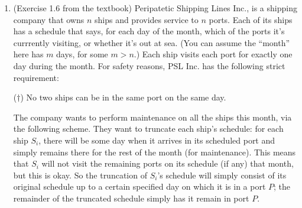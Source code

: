 \documentclass[12pt]{article}
\begin{document}
\begin{enumerate}[leftmargin=*]
\begin{proof}[Solution to (b)]
    There does not always exist a perfect matching with no weak instability.
    Suppose we have a set of two student, $\{s, s'\}$, and a set of two hospital, $\{h, h'\}$. The preference lists are as follows:
    \begin{center}
        $s$ is indifferent between $h$ and $h'$;\\
        $s'$ is indifferent between $h$ and $h'$;\\
        $h$ prefers $s$ to $s'$;\\
        $h'$ prefers $s$ to $s'$.
    \end{center}

    In this case, there are two perfect matchings: $M_1 = \{(s, h), (s', h')\}$ and $M_2 = \{(s, h'), (s', h)\}$. 
    Both of these matchings have a weak instability. 
    In $M_1$, the pair $(s, h')$ is a weak instability because $h'$ prefers $s$ to $s'$ and $s$ is indifferent between the two hospitals.
    In $M_2$, the pair $(s, h)$ is a weak instability because $h$ prefers $s$ to $s'$ and $s$ is indifferent between the two hospitals. 
    Therefore, in this example, every perfect matching has a weak instability.
\end{proof}




\item (Exercise 1.6 from the textbook) Peripatetic Shipping Lines Inc., is a shipping company that owns $n$ ships and provides service to $n$ ports. Each of its ships has a schedule that says, for each day of the month, which of the ports it's currrently visiting, or whether it's out at sea. (You can assume the ``month'' here has $m$ days, for some $m > n$.) Each ship visits each port for exactly one day during the month. For safety reasons, PSL Inc. has the following strict requirement:

\begin{center}
($\dagger$) No two ships can be in the same port on the same day.
\end{center}

The company wants to perform maintenance on all the ships this month, via the following scheme. They want to truncate each ship's schedule: for each ship $S_i$, there will be some day when it arrives in its scheduled port and simply remains there for the rest of the month (for maintenance). This means that $S_i$ will not visit the remaining ports on its schedule (if any) that month, but this is okay. So the truncation of $S_i$'s schedule will simply consist of its original schedule up to a certain specified day on which it is in a port $P$; the remainder of the truncated schedule simply has it remain in port $P$.


\end{enumerate}
\end{document}

